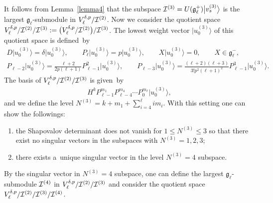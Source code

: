 \documentclass[11pt]{article}
\numberwithin{equation}{section}
\begin{document}
It follows from Lemma~\ref{lemma4} that the subspace $ {\cal I}^{(3)} = U({\mathfrak g}_{\ell}^+) \big|v_s^{(3)}\big\rangle  $ is
the largest ${\mathfrak g}_{\ell}$-submodule in $ V^{\delta,p}_{\ell}/{\cal I}^{(2)}$.
Now we consider the quotient space $ V^{\delta,p}_{\ell}/{\cal I}^{(2)}/{\cal I}^{(3)}:= \big(V^{\delta,p}_{\ell}/{\cal
I}^{(2)}\big)/{\cal I}^{(3)}$.
The lowest weight vector $ \big|u_0^{(3)}\big\rangle  $ of this quotient space is def\/ined~by
\begin{gather*}
    D \big|u_0^{(3)}\big\rangle  = \delta \big|u_0^{(3)}\big\rangle ,
\qquad
P_{\ell} \big|u_0^{(3)}\big\rangle  = p \big|u_0^{(3)}\big\rangle ,
\qquad
    X \big|u_0^{(3)}\big\rangle  = 0, \qquad X \in {\mathfrak g}_{\ell}^-,
\nonumber
\\
    P_{\ell-2} \big|u_0^{(3)}\big\rangle  = \frac{\ell+2}{2p  (\ell+1)} P_{\ell-1}^2 \big|u_0^{(3)}\big\rangle ,
\qquad
P_{\ell-3} \big|u_0^{(3)}\big\rangle  = \frac{(\ell+2) (\ell+3)}{3!  p^2  (\ell+1)^2} P_{\ell-1}^3\big|u_0^{(3)}\big\rangle .
\end{gather*}
The basis of $ V^{\delta,p}_{\ell}/{\cal I}^{(2)}/{\cal I}^{(3)} $ is given~by
\begin{gather*}
H^k  P_{\ell-1}^{m_1} P_{\ell-4}^{m_4} \cdots P_0^{m_{\ell}} \big|u_0^{(3)}\big\rangle ,
\end{gather*}
and we def\/ine the level $  N^{(3)} = k + m_1 + \sum\limits_{i=4}^{\ell} i  m_i$.
With this setting one can show the followings:
\begin{enumerate}\itemsep=0pt
\item[i)] the Shapovalov determinant does not vanish for $ 1 \leq N^{(3)} \leq 3 $ so that there exist no singular vectors
in the subspaces with $ N^{(3)} = 1, 2, 3$;
\item[ii)] there exists a~unique singular vector in the level $ N^{(3)} = 4 $ subspace.
\end{enumerate}
By the singular vector in $ N^{(3)} = 4 $ subspace, one can def\/ine the largest ${\mathfrak g}_{\ell}$-submodule $ {\cal
I}^{(4)} $ in $ V^{\delta,p}_{\ell}/{\cal I}^{(2)}/{\cal I}^{(3)} $ and consider the quotient space $
V^{\delta,p}_{\ell}/{\cal I}^{(2)}/{\cal I}^{(3)}/{\cal I}^{(4)}$.
\end{document}
